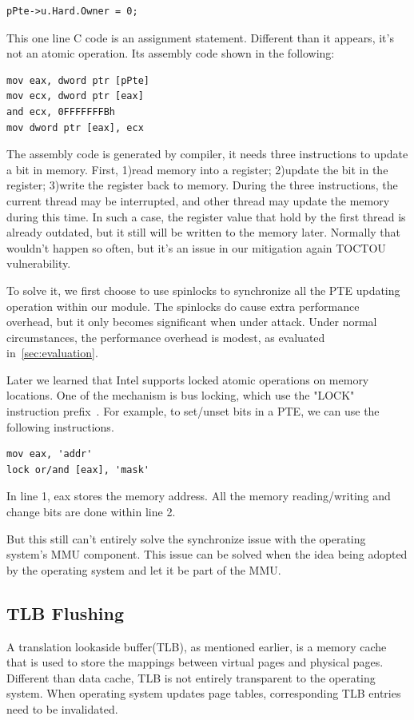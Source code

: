 \begin{lstlisting}[style=code] 
pPte->u.Hard.Owner = 0;
\end{lstlisting}

This one line C code is an assignment statement. Different than it appears, it's not an atomic operation. Its assembly code shown in the following:

\begin{lstlisting}[style=code] 
mov eax, dword ptr [pPte]
mov ecx, dword ptr [eax]
and ecx, 0FFFFFFFBh
mov dword ptr [eax], ecx
\end{lstlisting}

The assembly code is generated by compiler, it needs three instructions to update a bit in memory. First, 1)read memory into a register; 2)update the bit in the register; 3)write the register back to memory. During the three instructions, the current thread may be interrupted, and other thread may update the memory during this time. In such a case, the register value that hold by the first thread is already outdated, but it still will be written to the memory later. Normally that wouldn't happen so often, but it's an issue in our mitigation again TOCTOU vulnerability.

To solve it, we first choose to use spinlocks to synchronize all the PTE updating operation within our module. The spinlocks do cause extra performance overhead, but it only becomes significant when under attack. Under normal circumstances, the performance overhead is modest, as evaluated in~\autoref{sec:evaluation}.  

Later we learned that Intel supports locked atomic operations on memory locations. One of the mechanism is bus locking, which use the "LOCK" instruction prefix~\cite{intelmanualchapter8}. For example, to set/unset bits in a PTE, we can use the following instructions.

\begin{lstlisting}[style=code] 
mov eax, 'addr'
lock or/and [eax], 'mask'
\end{lstlisting}

In line 1, eax stores the memory address. All the memory reading/writing and change bits are done within line 2.

But this still can't entirely solve the synchronize issue with the operating system's MMU component. This issue can be solved when the idea being adopted by the operating system and let it be part of the MMU. 

\subsection{TLB Flushing}
A translation lookaside buffer(TLB), as mentioned earlier, is a memory cache that is used to store the mappings between virtual pages and physical pages. Different than data cache, TLB is not entirely transparent to the operating system. When operating system updates page tables, corresponding TLB entries need to be invalidated.

